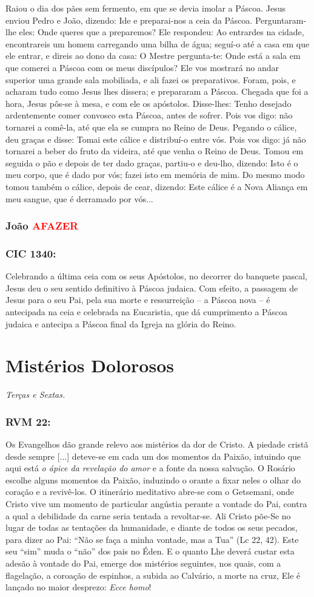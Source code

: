 \documentclass[10pt,a5paper]{book}
\newcommand{\from}[1]{\subsection*{#1}}
\newcommand{\TODO}{\textcolor{red}{\ttfamily AFAZER}}
\begin{document}
Raiou o dia dos pães sem fermento, em que se devia imolar a Páscoa.
Jesus enviou Pedro e João, dizendo:
Ide e preparai-nos a ceia da Páscoa.
Perguntaram-lhe eles:
Onde queres que a preparemos?
Ele respondeu:
Ao entrardes na cidade, encontrareis um homem carregando uma bilha de água;
seguí-o até a casa em que ele entrar, e direis ao dono da casa:
O Mestre pergunta-te:
Onde está a sala em que comerei a Páscoa com os meus discípulos?
Ele vos mostrará no andar superior uma grande sala mobiliada, e ali fazei os preparativos.
Foram, pois, e acharam tudo como Jesus lhes dissera;
e prepararam a Páscoa.
Chegada que foi a hora, Jesus pôs-se à mesa, e com ele os apóstolos.
Disse-lhes:
Tenho desejado ardentemente comer convosco esta Páscoa, antes de sofrer.
Pois vos digo:
não tornarei a comê-la, até que ela se cumpra no Reino de Deus.
Pegando o cálice, deu graças e disse:
Tomai este cálice e distribuí-o entre vós.
Pois vos digo:
já não tornarei a beber do fruto da videira, até que venha o Reino de Deus.
Tomou em seguida o pão e depois de ter dado graças, partiu-o e deu-lho, dizendo:
Isto é o meu corpo, que é dado por vós;
fazei isto em memória de mim.
Do mesmo modo tomou também o cálice, depois de cear, dizendo:
Este cálice é a Nova Aliança em meu sangue, que é derramado por vós...

\from{João \TODO}

\from{CIC 1340:}

Celebrando a última ceia com os seus Apóstolos, no decorrer do banquete pascal, Jesus deu o seu sentido definitivo à Páscoa judaica.
Com efeito, a passagem de Jesus para o seu Pai, pela sua morte e ressurreição -- a Páscoa nova -- é antecipada na ceia e celebrada na Eucaristia, que dá cumprimento a Páscoa judaica e antecipa a Páscoa final da Igreja na glória do Reino.


\chapter{Mistérios Dolorosos}

\emph{Terças e Sextas.}

\from{RVM 22:}

Os Evangelhos dão grande relevo aos mistérios da dor de Cristo.
A piedade cristã desde sempre [...] deteve-se em cada um dos momentos da Paixão, intuindo que aqui está \emph{o ápice da revelação do amor} e a fonte da nossa salvação.
O Rosário escolhe alguns momentos da Paixão, induzindo o orante a fixar neles o olhar do coração e a revivê-los.
O itinerário meditativo abre-se com o Getsemani, onde Cristo vive um momento de particular angústia perante a vontade do Pai, contra a qual a debilidade da carne seria tentada a revoltar-se.
Ali Cristo põe-Se no lugar de todas as tentações da humanidade, e diante de todos os seus pecados, para dizer ao Pai:
``Não se faça a minha vontade, mas a Tua'' (Lc 22, 42).
Este seu ``sim'' muda o ``não'' dos pais no Éden.
E o quanto Lhe deverá custar esta adesão à vontade do Pai, emerge dos mistérios seguintes, nos quais, com a flagelação, a coroação de espinhos, a subida ao Calvário, a morte na cruz, Ele é lançado no maior desprezo:
\emph{Ecce homo}!
\end{document}
